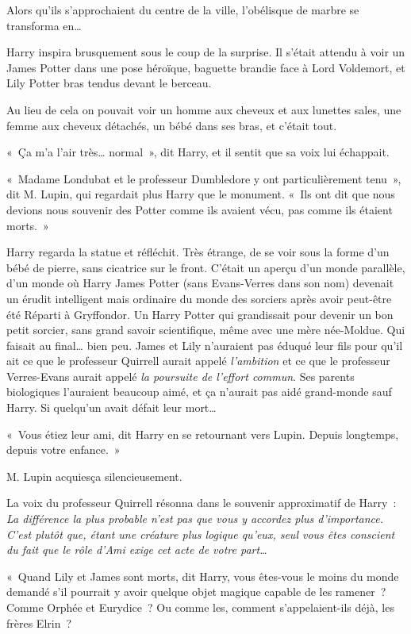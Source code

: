 Alors qu'ils s'approchaient du centre de la ville, l'obélisque de marbre se transforma en…

Harry inspira brusquement sous le coup de la surprise. Il s'était attendu à voir un James Potter dans une pose héroïque, baguette brandie face à Lord Voldemort, et Lily Potter bras tendus devant le berceau.

Au lieu de cela on pouvait voir un homme aux cheveux et aux lunettes sales, une femme aux cheveux détachés, un bébé dans ses bras, et c'était tout.

«~Ça m'a l'air très… normal~», dit Harry, et il sentit que sa voix lui échappait.

«~Madame Londubat et le professeur Dumbledore y ont particulièrement tenu~», dit M. Lupin, qui regardait plus Harry que le monument. «~Ils ont dit que nous devions nous souvenir des Potter comme ils avaient vécu, pas comme ils étaient morts.~»

Harry regarda la statue et réfléchit. Très étrange, de se voir sous la forme d'un bébé de pierre, sans cicatrice sur le front. C'était un aperçu d'un monde parallèle, d'un monde où Harry James Potter (sans Evans-Verres dans son nom) devenait un érudit intelligent mais ordinaire du monde des sorciers après avoir peut-être été Réparti à Gryffondor. Un Harry Potter qui grandissait pour devenir un bon petit sorcier, sans grand savoir scientifique, même avec une mère née-Moldue. Qui faisait au final… bien peu. James et Lily n'auraient pas éduqué leur fils pour qu'il ait ce que le professeur Quirrell aurait appelé \emph{l'ambition} et ce que le professeur Verres-Evans aurait appelé \emph{la poursuite de l'effort commun}. Ses parents biologiques l'auraient beaucoup aimé, et ça n'aurait pas aidé grand-monde sauf Harry. Si quelqu'un avait défait leur mort…

«~Vous étiez leur ami, dit Harry en se retournant vers Lupin. Depuis longtemps, depuis votre enfance.~»

M. Lupin acquiesça silencieusement.

La voix du professeur Quirrell résonna dans le souvenir approximatif de Harry~: \emph{La différence la plus probable n'est pas que vous y accordez plus d'importance. C'est plutôt que, étant une créature plus logique qu'eux, seul vous êtes conscient du fait que le rôle d'Ami exige cet acte de votre part…}

«~Quand Lily et James sont morts, dit Harry, vous êtes-vous le moins du monde demandé s'il pourrait y avoir quelque objet magique capable de les ramener~? Comme Orphée et Eurydice~? Ou comme les, comment s'appelaient-ils déjà, les frères Elrin~?

